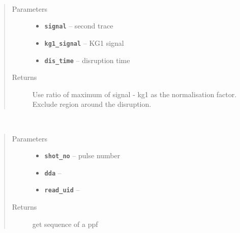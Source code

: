 \documentclass[letterpaper,10pt,english]{sphinxmanual}
\begin{document}

\begin{fulllineitems}
\label{library:library.normalise}~\begin{quote}\begin{description}
\item[{Parameters}] \leavevmode\begin{itemize}
\item {} 
\textbf{\texttt{signal}} -- second trace

\item {} 
\textbf{\texttt{kg1\_signal}} -- KG1 signal

\item {} 
\textbf{\texttt{dis\_time}} -- disruption time

\end{itemize}

\item[{Returns}] \leavevmode
Use ratio of maximum of signal - kg1 as the normalisation factor. Exclude region around the disruption.

\end{description}\end{quote}

\end{fulllineitems}


\begin{fulllineitems}
\label{library:library.get_seq}~\begin{quote}\begin{description}
\item[{Parameters}] \leavevmode\begin{itemize}
\item {} 
\textbf{\texttt{shot\_no}} -- pulse number

\item {} 
\textbf{\texttt{dda}} -- 

\item {} 
\textbf{\texttt{read\_uid}} -- 

\end{itemize}

\item[{Returns}] \leavevmode
get sequence of a ppf

\end{description}\end{quote}

\end{fulllineitems}
\end{document}

